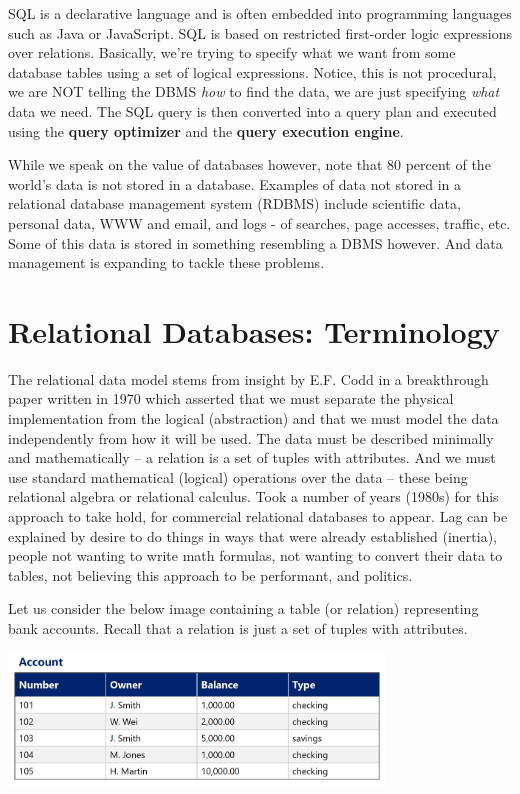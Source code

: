\documentclass{article}
\begin{document}
SQL is a declarative language and is often embedded into programming languages such as Java or JavaScript. SQL is based on restricted first-order logic expressions over relations. Basically, we're trying to specify what we want from some database tables using a set of logical expressions. Notice, this is not procedural, we are NOT telling the DBMS \textit{how} to find the data, we are just specifying \textit{what} data we need. The SQL query is then converted into a query plan and executed using the \textbf{query optimizer} and the \textbf{query execution engine}.

While we speak on the value of databases however, note that 80 percent of the world's data is not stored in a database. Examples of data not stored in a relational database management system (RDBMS) include scientific data, personal data, WWW and email, and logs - of searches, page accesses, traffic, etc. Some of this data is stored in something resembling a DBMS however. And data management is expanding to tackle these problems.

\section*{Relational Databases: Terminology}
The relational data model stems from insight by E.F. Codd in a breakthrough paper written in 1970 which asserted that we must separate the physical implementation from the logical (abstraction) and that we must model the data independently from how it will be used. The data must be described minimally and mathematically -- a relation is a set of tuples with attributes. And we must use standard mathematical (logical) operations over the data -- these being relational algebra or relational calculus. Took a number of years (1980s) for this approach to take hold, for commercial relational databases to appear. Lag can be explained by desire to do things in ways that were already established (inertia), people not wanting to write math formulas, not wanting to convert their data to tables, not believing this approach to be performant, and politics. 

Let us consider the below image containing a table (or relation) representing bank accounts. Recall that a relation is just a set of tuples with attributes.

\includegraphics[width = 10cm]{assets/bankAccountsExample.png}
\end{document}

